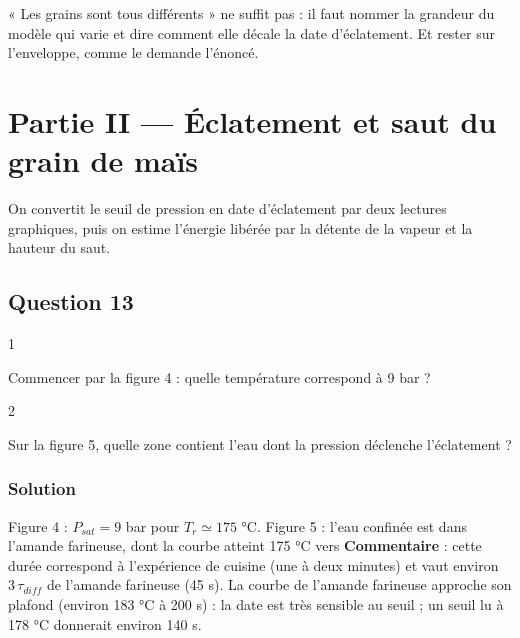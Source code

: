 \documentclass[11pt,a4paper]{article}
\newcommand{\equationajustee}[1]{%
  \sbox{\boiteequation}{$\displaystyle #1$}%
  \ifdim\wd\boiteequation>\linewidth
    \[\resizebox{\linewidth}{!}{\usebox{\boiteequation}}\]%
  \else
    \[#1\]%
  \fi}
\begin{document}
\begin{piege}

« Les grains sont tous différents » ne suffit pas : il faut nommer la grandeur du modèle qui varie et dire comment elle décale la date d'éclatement. Et rester sur l'enveloppe, comme le demande l'énoncé.

\end{piege}

\hypertarget{partie-ii-uxe9clatement-et-saut-du-grain-de-mauxefs}{%
\section{Partie II --- Éclatement et saut du grain de maïs}\label{partie-ii-uxe9clatement-et-saut-du-grain-de-mauxefs}}

On convertit le seuil de pression en date d'éclatement par deux lectures graphiques, puis on estime l'énergie libérée par la détente de la vapeur et la hauteur du saut.

\hypertarget{question-13}{%
\subsection{Question 13}\label{question-13}}

\begin{indication}{1}

Commencer par la figure 4 : quelle température correspond à 9 bar ?

\end{indication}

\begin{indication}{2}

Sur la figure 5, quelle zone contient l'eau dont la pression déclenche l'éclatement ?

\end{indication}

\hypertarget{solution-12}{%
\subsubsection{Solution}\label{solution-12}}

Figure 4 : \(P_{sat}=9\) bar pour \(T_r\simeq175\) °C. Figure 5 : l'eau confinée est dans l'amande farineuse, dont la courbe atteint 175 °C vers
\equationajustee{\boxed{t_{\text{\text{éclatement}}}\simeq1{,}3\cdot10^2\ \mathrm s\simeq2\ \text{min}}}
\textbf{Commentaire} : cette durée correspond à l'expérience de cuisine (une à deux minutes) et vaut environ \(3\,\tau_{diff}\) de l'amande farineuse (45 s). La courbe de l'amande farineuse approche son plafond (environ 183 °C à 200 s) : la date est très sensible au seuil ; un seuil lu à 178 °C donnerait environ 140 s.
\end{document}
